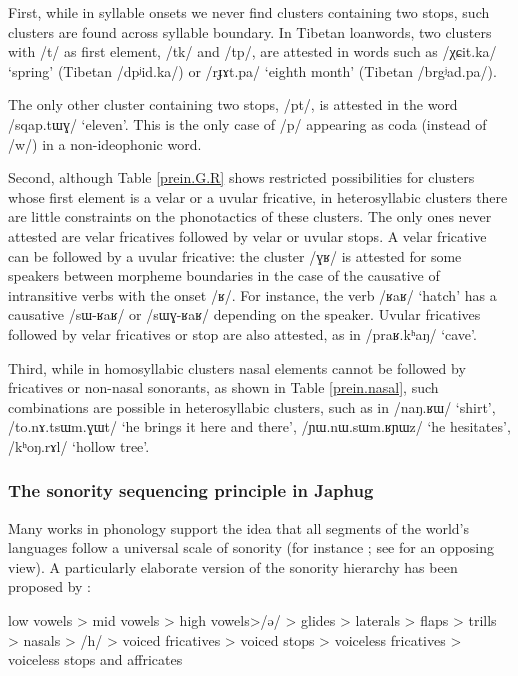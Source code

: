 \documentclass[oneside,a4paper,11pt]{article}
\newcommand{\ipa}[1]{\mbox{\phon/#1/}}
\begin{document}
 First, while in syllable onsets we never find clusters containing two stops, such clusters are found across syllable boundary. In Tibetan loanwords, two clusters with \ipa{t} as first element,  \ipa{tk} and \ipa{tp}, are attested in words such as \ipa{χɕit.ka} `spring' (Tibetan \ipa{dpʲid.ka}) or \ipa{rɟɤt.pa} `eighth month' (Tibetan \ipa{brgʲad.pa}). 
 
 The only  other cluster containing two stops, \ipa{pt}, is attested in the word  \ipa{sqap.tɯɣ} `eleven'. This is the only case of \ipa{p} appearing as coda (instead of \ipa{w}) in a non-ideophonic  word.
 
 Second, although Table \ref{prein.G.R} shows restricted possibilities for clusters whose first element is a velar or a uvular fricative, in heterosyllabic clusters there are little constraints on the phonotactics of these clusters. The only ones never attested are velar fricatives followed by velar or uvular stops. A velar fricative can be followed by a uvular fricative:  the cluster \ipa{ɣʁ} is attested for some speakers between morpheme boundaries in the case of the causative of intransitive verbs with the onset \ipa{ʁ}. For instance, the verb \ipa{ʁaʁ} `hatch' has a causative \ipa{sɯ-ʁaʁ} or \ipa{sɯɣ-ʁaʁ} depending on the speaker. Uvular fricatives followed by velar fricatives or stop are also attested, as in \ipa{praʁ.kʰaŋ} `cave'.
 
Third, while in homosyllabic clusters nasal elements cannot be followed by fricatives or non-nasal sonorants, as shown in Table \ref{prein.nasal}, such combinations are possible in heterosyllabic clusters, such as in \ipa{naŋ.ʁɯ} `shirt', \ipa{to.nɤ.tsɯm.ɣɯt} `he brings it here and there', \ipa{ɲɯ.nɯ.sɯm.ʁɲɯz} `he hesitates', \ipa{kʰoŋ.rɤl} `hollow tree'.

\subsubsection*{The sonority sequencing principle in Japhug}
Many works in phonology support the idea that all segments of the world's languages follow a universal scale of sonority (for instance \citealt{vennemann88syllable, blevins95syllable, parker02sonority, baroni14invariant}; see \citealt{ohala90sonority} for an opposing view). A particularly elaborate version of the sonority hierarchy has been proposed by \citet[235]{parker02sonority}:
\begin{exe}
\ex 
\glt low vowels > mid vowels > high vowels>\ipa{ə} > glides > laterals > flaps
> trills > nasals > \ipa{h} > voiced fricatives > voiced stops > voiceless
fricatives > voiceless stops and affricates
\end{exe}
\end{document}
